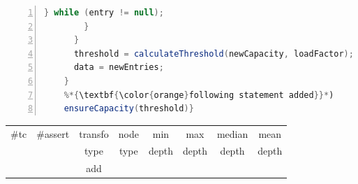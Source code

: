 \begin{figure}[ht]
\begin{lstlisting}[caption={\texttt{ensureCapacity} in commons.collection},label={lst:ensureCapacity},language=java,numbers=left]
          } while (entry != null);
        }
      }
      threshold = calculateThreshold(newCapacity, loadFactor);
      data = newEntries;
    }
    %*{\textbf{\color{orange}following statement added}}*)
    ensureCapacity(threshold)}
\end{lstlisting}
\tabcolsep=0.11cm
\begin{tabular}{>{\small}c>{\small}c>{\small}c>{\small}c>{\small}c>{\small}c>{\small}c>{\small}c}
\hline
\rowcolor{lightgray} \#tc & \#assert & transfo & node & min & max & median & mean   \\
\rowcolor{lightgray}  & & type & type & depth  & depth & depth & depth  \\ 
\hline
 &  & add &  &  &  &  & \\
\hline
\end{tabular}
\end{figure}
